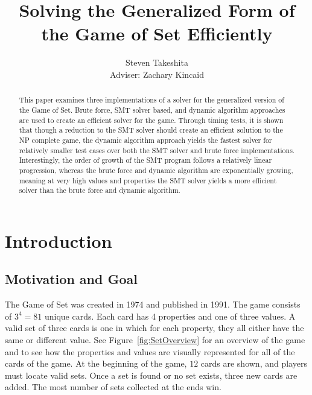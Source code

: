 \documentclass[pageno]{jpaper}
\begin{document}
\title{Solving the Generalized Form of the Game of Set Efficiently}

\author{Steven Takeshita\\Adviser: Zachary Kincaid}

\date{}
\maketitle

\thispagestyle{empty}
\doublespacing
\begin{abstract}
This paper examines three implementations of a solver for the generalized version of the Game of Set. Brute force, SMT solver based, and dynamic algorithm approaches are used to create an efficient solver for the game. Through timing tests, it is shown that though a reduction to the SMT solver should create an efficient solution to the NP complete game, the dynamic algorithm approach yields the fastest solver for relatively smaller test cases over both the SMT solver and brute force implementations. Interestingly, the order of growth of the SMT program follows a relatively linear progression, whereas the brute force and dynamic algorithm are exponentially growing, meaning at very high values and properties the SMT solver yields a more efficient solver than the brute force and dynamic algorithm. 
\end{abstract}

\section{Introduction}

\subsection{Motivation and Goal}

The Game of Set was created in 1974 and published in 1991. The game consists of $3^4 = 81$ unique cards. Each card has 4 properties and one of three values. A valid set of three cards is one in which for each property, they all either have the same or different value. See Figure~\ref{fig:SetOverview} for an overview of the game and to see how the properties and values are visually represented for all of the cards of the game. At the beginning of the game, $12$ cards are shown, and players must locate valid sets. Once a set is found or no set exists, three new cards are added. The most number of sets collected at the ends win. 
\end{document}
